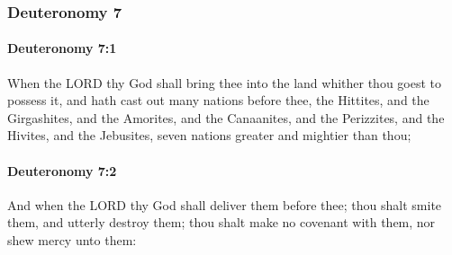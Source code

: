 	\subsubsection{Deuteronomy 7} %
		\label{DEUTERONOMY-7}

		\paragraph{Deuteronomy 7:1} %
			\label{DEUTERONOMY-7-1}

			When the LORD thy God shall bring thee into the land whither thou goest to possess it, and hath cast out many nations before thee, the Hittites, and the Girgashites, and the Amorites, and the Canaanites, and the Perizzites, and the Hivites, and the Jebusites, seven nations greater and mightier than thou;


		\paragraph{Deuteronomy 7:2} %
			\label{DEUTERONOMY-7-2}

			And when the LORD thy God shall deliver them before thee; thou shalt smite them, and utterly destroy them; thou shalt make no covenant with them, nor shew mercy unto them:

